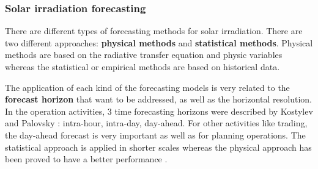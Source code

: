 
 
  



\subsubsection{Solar irradiation forecasting}

There are different types of forecasting methods for solar irradiation. There are two different approaches: \textbf{physical methods} and \textbf{statistical methods}. Physical methods are based on the radiative transfer equation and physic variables whereas the statistical or empirical methods are based on historical data.

The application of each kind of the forecasting models is very related to the \textbf{forecast horizon} that want to be addressed, as well as the horizontal resolution. In the operation activities, 3 time forecasting horizons were described by Kostylev and Palovsky \cite*{kostylev2011solar}: intra-hour, intra-day, day-ahead. For other activities like trading, the day-ahead forecast is very important as well as for planning operations. The statistical approach is applied in shorter scales whereas the physical approach has been proved to have a better performance \cite*{Perez2010, Diagne2013, Widen2015}.%

